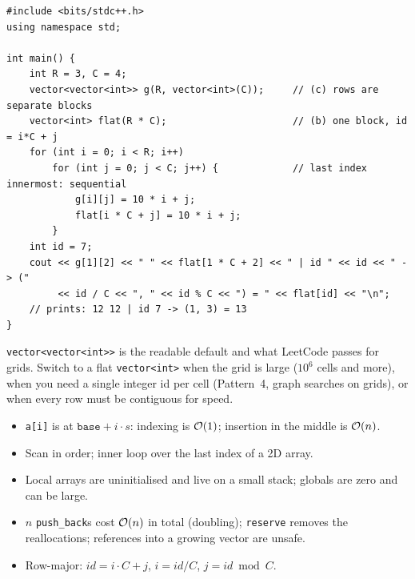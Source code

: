 \begin{lstlisting}[style=cpp]
#include <bits/stdc++.h>
using namespace std;

int main() {
    int R = 3, C = 4;
    vector<vector<int>> g(R, vector<int>(C));     // (c) rows are separate blocks
    vector<int> flat(R * C);                      // (b) one block, id = i*C + j
    for (int i = 0; i < R; i++)
        for (int j = 0; j < C; j++) {             // last index innermost: sequential
            g[i][j] = 10 * i + j;
            flat[i * C + j] = 10 * i + j;
        }
    int id = 7;
    cout << g[1][2] << " " << flat[1 * C + 2] << " | id " << id << " -> ("
         << id / C << ", " << id % C << ") = " << flat[id] << "\n";
    // prints: 12 12 | id 7 -> (1, 3) = 13
}
\end{lstlisting}

\begin{insightbox}
\texttt{vector<vector<int>>} is the readable default and what LeetCode passes for grids. Switch to a flat \texttt{vector<int>} when the grid is large ($10^6$ cells and more), when you need a single integer id per cell (Pattern~4, graph searches on grids), or when every row must be contiguous for speed.
\end{insightbox}

\begin{checklistbox}
\begin{itemize}[leftmargin=*]
    \item[$\square$] \texttt{a[i]} is at $\texttt{base} + i\cdot s$: indexing is $\mathcal{O}(1)$; insertion in the middle is $\mathcal{O}(n)$.
    \item[$\square$] Scan in order; inner loop over the last index of a 2D array.
    \item[$\square$] Local arrays are uninitialised and live on a small stack; globals are zero and can be large.
    \item[$\square$] $n$ \texttt{push\_back}s cost $\mathcal{O}(n)$ in total (doubling); \texttt{reserve} removes the reallocations; references into a growing vector are unsafe.
    \item[$\square$] Row-major: $\mathit{id} = i\cdot C + j$, $i = \mathit{id}/C$, $j = \mathit{id} \bmod C$.
\end{itemize}
\end{checklistbox}
